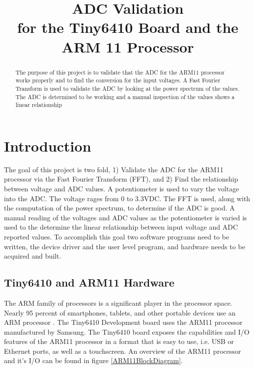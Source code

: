 \documentclass[10pt,conference]{IEEEtran}
\begin{document}
\title{ADC Validation\\
	   for the Tiny6410 Board and the ARM 11 Processor}

\author
{
}

\maketitle

%
%
\begin{abstract}
The purpose of this project is to validate that the ADC for the ARM11 processor works properly and to find the conversion for the input voltages. A Fast Fourier Transform is used to validate the ADC by looking at the power spectrum of the values. The ADC is determined to be working and a manual inspection of the values shows a linear relationship
\end{abstract}

%
%
\section{Introduction}
The goal of this project is two fold, 1) Validate the ADC for the ARM11 processor via the Fast Fourier Transform (FFT), and 2) Find the relationship between voltage and ADC values. A potentiometer is used to vary the voltage into the ADC. The voltage rages from 0 to 3.3VDC. The FFT is used, along with the computation of the power spectrum, to determine if the ADC is good. A manual reading of the voltages and ADC values as the potentiometer is varied is used to the determine the linear relationship between input voltage and ADC reported values. To accomplish this goal two software programs need to be written, the device driver and the user level program, and hardware needs to be acquired and built.

\subsection{Tiny6410 and ARM11 Hardware}
The ARM family of processors is a significant player in the processor space. Nearly 95 percent of smartphones, tablets, and other portable devices use an ARM processor \cite{ARMSales}. The Tiny6410 Development board uses the ARM11 processor manufactured by Samsung. The Tiny6410 board exposes the capabilities and I/O features of the ARM11 processor in a format that is easy to use, i.e. USB or Ethernet ports, as well as a touchscreen. An overview of the ARM11 processor and it's I/O can be found in figure \ref{ARM11BlockDiagram}.
\end{document}
